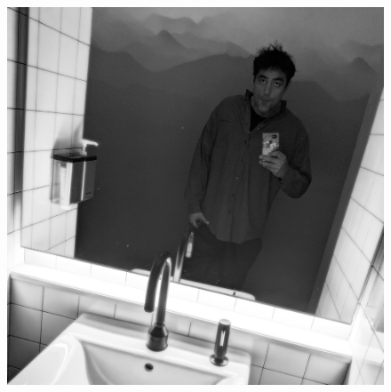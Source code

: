 \documentclass[letterpaper,10pt]{article}
\begin{document}
\begin{figure}
  \centering
\includegraphics[width=.75\linewidth]{media/theauthor.jpg}
\end{figure}
\cleardoublepage
%
\end{document}
